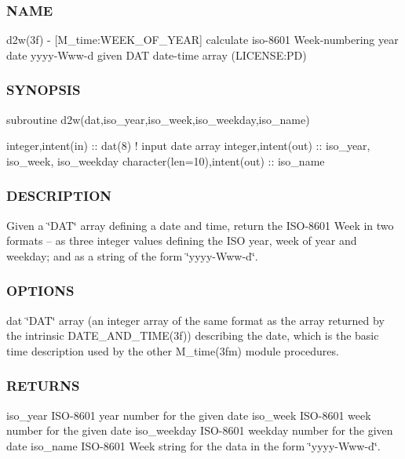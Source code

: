 \subsubsection*{N\+A\+ME}

d2w(3f) -\/ \mbox{[}M\+\_\+time\+:W\+E\+E\+K\+\_\+\+O\+F\+\_\+\+Y\+E\+AR\mbox{]} calculate iso-\/8601 Week-\/numbering year date yyyy-\/\+Www-\/d given D\+AT date-\/time array (L\+I\+C\+E\+N\+SE\+:PD) 

\subsubsection*{S\+Y\+N\+O\+P\+S\+IS}

\begin{DoxyVerb}subroutine d2w(dat,iso_year,iso_week,iso_weekday,iso_name)

 integer,intent(in)              :: dat(8)     ! input date array
 integer,intent(out)             :: iso_year, iso_week, iso_weekday
 character(len=10),intent(out)   :: iso_name
\end{DoxyVerb}


\subsubsection*{D\+E\+S\+C\+R\+I\+P\+T\+I\+ON}

Given a \char`\"{}\+D\+A\+T\char`\"{} array defining a date and time, return the I\+S\+O-\/8601 Week in two formats -- as three integer values defining the I\+SO year, week of year and weekday; and as a string of the form \char`\"{}yyyy-\/\+Www-\/d\char`\"{}.

\subsubsection*{O\+P\+T\+I\+O\+NS}

dat \char`\"{}\+D\+A\+T\char`\"{} array (an integer array of the same format as the array returned by the intrinsic D\+A\+T\+E\+\_\+\+A\+N\+D\+\_\+\+T\+I\+M\+E(3f)) describing the date, which is the basic time description used by the other M\+\_\+time(3fm) module procedures. \subsubsection*{R\+E\+T\+U\+R\+NS}

iso\+\_\+year I\+S\+O-\/8601 year number for the given date iso\+\_\+week I\+S\+O-\/8601 week number for the given date iso\+\_\+weekday I\+S\+O-\/8601 weekday number for the given date iso\+\_\+name I\+S\+O-\/8601 Week string for the data in the form \char`\"{}yyyy-\/\+Www-\/d\char`\"{}.

